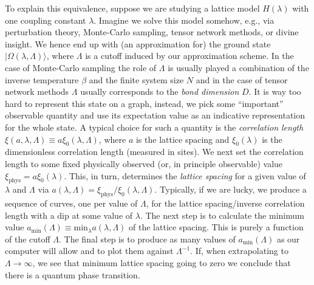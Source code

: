 \documentclass[11pt]{amsart}
\theoremstyle{plain}%
\theoremstyle{definition}
\theoremstyle{remark}
\begin{document}
To explain this equivalence, suppose we are studying a lattice model $H(\lambda)$ with one coupling constant $\lambda$. Imagine we solve this model somehow, e.g., via perturbation theory, Monte-Carlo sampling, tensor network methods, or divine insight. We hence end up with (an approximation for) the ground state $|\Omega(\lambda,\Lambda)\rangle$, where $\Lambda$ is a cutoff induced by our approximation scheme. In the case of Monte-Carlo sampling the role of $\Lambda$ is usually played a combination of the inverse temperature $\beta$ and the finite system size $N$ and in the case of tensor network methods $\Lambda$ usually corresponds to the \emph{bond dimension} $D$. It is way too hard to represent this state on a graph, instead, we pick some ``important'' observable quantity and use its expectation value as an indicative representation for the whole state. A typical choice for such a quantity is the \emph{correlation length} $\xi(a,\lambda, \Lambda) \equiv a\xi_0(\lambda,\Lambda)$, where $a$ is the lattice spacing and $\xi_0(\lambda)$ is the dimensionless correlation length (measured in sites). We next set the correlation length to some fixed physically observed (or, in principle observable) value $\xi_{\text{phys}} = a\xi_0(\lambda)$. This, in turn, determines the \emph{lattice spacing} for a given value of $\lambda$ and $\Lambda$ via $a(\lambda, \Lambda) = \xi_{\text{phys}}/\xi_0(\lambda, \Lambda)$. Typically, if we are lucky, we produce a sequence of curves, one per value of $\Lambda$, for the lattice spacing/inverse correlation length with a dip at some value of $\lambda$. The next step is to calculate the minimum value $a_{\text{min}}(\Lambda) \equiv \text{min}_{\lambda} a(\lambda, \Lambda)$ of the lattice spacing. This is purely a function of the cutoff $\Lambda$. The final step is to produce as many values of $a_{\text{min}}(\Lambda)$ as our computer will allow and to plot them against $\Lambda^{-1}$. If, when extrapolating to $\Lambda \rightarrow \infty$, we see that minimum lattice spacing going to zero we conclude that there is a quantum phase transition. 
\end{document}
